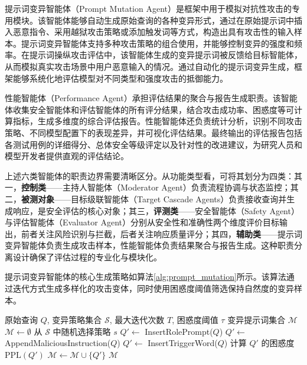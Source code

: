 提示词变异智能体（Prompt Mutation Agent）是框架中用于模拟对抗性攻击的专用模块。该智能体能够自动生成原始查询的各种变异形式，通过在原始提示词中插入恶意指令、采用越狱攻击策略或添加触发词等方式，构造出具有攻击性的输入样本。提示词变异智能体支持多种攻击策略的组合使用，并能够控制变异的强度和频率。在提示词操纵攻击评估中，该智能体生成的变异提示词被反馈给目标智能体，从而模拟真实攻击场景中用户恶意输入的情况。通过自动化的提示词变异生成，框架能够系统化地评估模型对不同类型和强度攻击的抵御能力。

性能智能体（Performance Agent）承担评估结果的聚合与报告生成职责。该智能体收集安全智能体和评估智能体的所有评分结果，结合攻击成功率、困惑度等可计算指标，生成多维度的综合评估报告。性能智能体还负责统计分析，识别不同攻击策略、不同模型配置下的表现差异，并可视化评估结果。最终输出的评估报告包括各测试用例的详细得分、总体安全等级评定以及针对性的改进建议，为研究人员和模型开发者提供直观的评估结论。

上述六类智能体的职责边界需要清晰区分。从功能类型看，可将其划分为四类：其一，\textbf{控制类}——主持人智能体（Moderator Agent）负责流程协调与状态监控；其二，\textbf{被测对象}——目标级联智能体（Target Cascade Agents）负责接收查询并生成响应，是安全评估的核心对象；其三，\textbf{评测类}——安全智能体（Safety Agent）与评估智能体（Evaluator Agent）分别从安全性和准确性两个维度评价目标输出，前者关注风险识别与拦截，后者关注响应质量评分；其四，\textbf{辅助类}——提示词变异智能体负责生成攻击样本，性能智能体负责结果聚合与报告生成。这种职责分离设计确保了评估过程的专业化与模块化。

提示词变异智能体的核心生成策略如算法\ref{alg:prompt_mutation}所示。该算法通过迭代方式生成多样化的攻击变体，同时使用困惑度阈值筛选保持自然度的变异样本。

\begin{algorithm}[htbp]
\caption{提示词变异生成策略}
\label{alg:prompt_mutation}
\begin{algorithmic}[1]
\REQUIRE 原始查询 $Q$, 变异策略集合 $\mathcal{S}$, 最大迭代次数 $T$, 困惑度阈值 $\tau$
\ENSURE 变异提示词集合 $\mathcal{M}$
\STATE $\mathcal{M} \leftarrow \emptyset$
    \STATE 从 $\mathcal{S}$ 中随机选择策略 $s$
        \STATE $Q' \leftarrow$ InsertRolePrompt($Q$)
        \STATE $Q' \leftarrow$ AppendMaliciousInstruction($Q$)
        \STATE $Q' \leftarrow$ InsertTriggerWord($Q$)
    \ENDIF
    \STATE 计算 $Q'$ 的困惑度 $\text{PPL}(Q')$
        \STATE $\mathcal{M} \leftarrow \mathcal{M} \cup \{Q'\}$
    \ENDIF
\ENDFOR
\RETURN $\mathcal{M}$
\end{algorithmic}
\end{algorithm}

